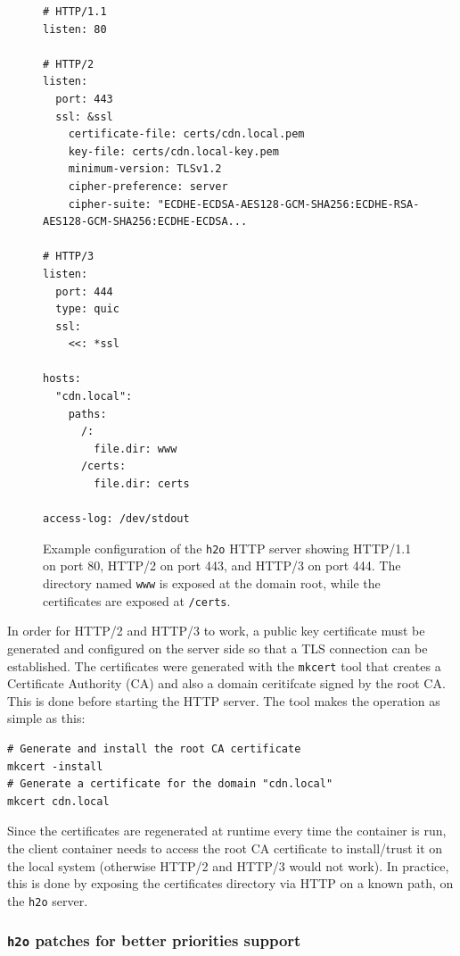 \begin{figure}[h]
    \centering
    \begin{verbatim}
# HTTP/1.1
listen: 80

# HTTP/2
listen:
  port: 443
  ssl: &ssl
    certificate-file: certs/cdn.local.pem
    key-file: certs/cdn.local-key.pem
    minimum-version: TLSv1.2
    cipher-preference: server
    cipher-suite: "ECDHE-ECDSA-AES128-GCM-SHA256:ECDHE-RSA-AES128-GCM-SHA256:ECDHE-ECDSA...

# HTTP/3
listen:
  port: 444
  type: quic
  ssl:
    <<: *ssl

hosts:
  "cdn.local":
    paths:
      /:
        file.dir: www
      /certs:
        file.dir: certs

access-log: /dev/stdout
    \end{verbatim}
    \caption{Example configuration of the \texttt{h2o} HTTP server showing HTTP/1.1 on port 80, HTTP/2 on port 443, and HTTP/3 on port 444. The directory named \texttt{www} is exposed at the domain root, while the certificates are exposed at \texttt{/certs}.}
    \label{fig:h2o}
\end{figure}

In order for HTTP/2 and HTTP/3 to work, a public key certificate must be generated and configured on the server side so that a TLS connection can be established. The certificates were generated with the \texttt{mkcert} tool that creates a Certificate Authority (CA) and also a domain ceritifcate signed by the root CA. This is done before starting the HTTP server. The tool makes the operation as simple as this:

\begin{verbatim}
# Generate and install the root CA certificate
mkcert -install
# Generate a certificate for the domain "cdn.local"
mkcert cdn.local
\end{verbatim}

Since the certificates are regenerated at runtime every time the container is run, the client container needs to access the root CA certificate to install/trust it on the local system (otherwise HTTP/2 and HTTP/3 would not work). In practice, this is done by exposing the certificates directory via HTTP on a known path, on the \texttt{h2o} server.

\subsubsection{\texttt{h2o} patches for better priorities support}
\label{sec:eval/testbed/cdn/h2o}

